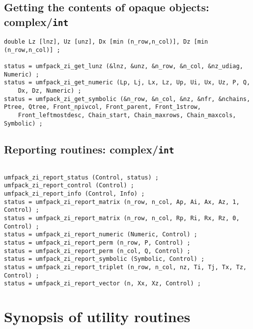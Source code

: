 \subsection{Getting the contents of opaque objects: complex/{\tt int}}

{\footnotesize
\begin{verbatim}
double Lz [lnz], Uz [unz], Dx [min (n_row,n_col)], Dz [min (n_row,n_col)] ;

status = umfpack_zi_get_lunz (&lnz, &unz, &n_row, &n_col, &nz_udiag, Numeric) ;
status = umfpack_zi_get_numeric (Lp, Lj, Lx, Lz, Up, Ui, Ux, Uz, P, Q,
    Dx, Dz, Numeric) ;
status = umfpack_zi_get_symbolic (&n_row, &n_col, &nz, &nfr, &nchains, 
Ptree, Qtree, Front_npivcol, Front_parent, Front_1strow,
    Front_leftmostdesc, Chain_start, Chain_maxrows, Chain_maxcols, Symbolic) ;
\end{verbatim}
}

\subsection{Reporting routines: complex/{\tt int}}

{\footnotesize
\begin{verbatim}

umfpack_zi_report_status (Control, status) ;
umfpack_zi_report_control (Control) ;
umfpack_zi_report_info (Control, Info) ;
status = umfpack_zi_report_matrix (n_row, n_col, Ap, Ai, Ax, Az, 1, Control) ;
status = umfpack_zi_report_matrix (n_row, n_col, Rp, Ri, Rx, Rz, 0, Control) ;
status = umfpack_zi_report_numeric (Numeric, Control) ;
status = umfpack_zi_report_perm (n_row, P, Control) ;
status = umfpack_zi_report_perm (n_col, Q, Control) ;
status = umfpack_zi_report_symbolic (Symbolic, Control) ;
status = umfpack_zi_report_triplet (n_row, n_col, nz, Ti, Tj, Tx, Tz, Control) ;
status = umfpack_zi_report_vector (n, Xx, Xz, Control) ;
\end{verbatim}
}





\section{Synopsis of utility routines}

